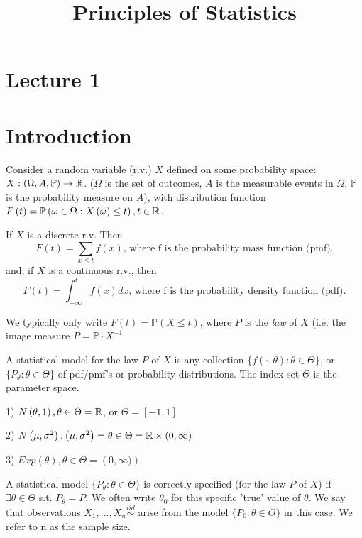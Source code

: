 \documentclass[a4paper]{article}
\title{Principles of Statistics}
\date{}
\begin{document}
	
\maketitle

\section*{Lecture 1}

\section{Introduction}

Consider a random variable (r.v.) $X$ defined on some probability space: $ X: (\Omega, A, \mathbb{P}) \to \mathbb{R}$. ($\Omega$ is the set of outcomes, $A$ is the measurable events in $\Omega$, $\mathbb{P}$ is the probability measure on $A $), with distribution function $F\left( t \right) = \mathbb{P}\left( \omega \in  \Omega : X\left( \omega \right) \le  t\right), t \in \mathbb{R}$.

If $X$ is a discrete r.v. Then
\[
	F(t) = \sum_{x\le t} f(x) \textrm{, where f is the probability mass function (pmf)}
.\] 
and, if $X$ is a continuous r.v., then
\[
	F(t) = \int_{- \infty}^{t} f(x) dx \textrm{, where f is the probability density function (pdf)}
.\] 

We typically only write $F(t) = \mathbb{P}\left( X \le  t\right)$, where $P$ is the \textit{law} of  $X$ (i.e. the image measure  $P = \mathbb{P} \cdot X^{-1} $

\begin{defn}
	A statistical model for the law $P$ of $X$ is any collection $\{ f\left(\cdot, \theta \right): \theta \in \Theta \} $, or $\{ P_{\theta} : \theta \in \Theta\} $ of pdf/pmf's or probability distributions. The index set $\Theta$ is the parameter space.
\end{defn}

\begin{eg}
	1) $N\left( \theta, 1 \right), \theta \in \Theta = \mathbb{R} $, or $\Theta = \left[ -1, 1 \right] $

	2) $N\left( \mu, \sigma ^2 \right), \left( \mu, \sigma ^2 \right) = \theta \in  \Theta = \mathbb{R} \times \left( 0, \infty \right)  $
	
	3) $Exp\left( \theta \right) , \theta \in \Theta = \left( 0, \infty) \right)  $
\end{eg}

\begin{defn}
	A statistical model $\{ P_{\theta} : \theta \in \Theta \} $ is correctly specified (for the law $P$ of $X$) if $\exists \theta \in \Theta$ s.t. $P_{\theta} = P$. We often write $\theta_{0}$ for this specific 'true' value of $\theta$. We say that observations $X_{1}, \ldots, X_{n} \stackrel{iid}{\sim} $ arise from the model $\{ P_{0} : \theta \in \Theta\} $ in this case. We refer to n as the sample size.
\end{defn}
\end{document}
